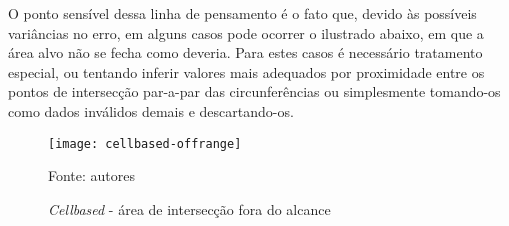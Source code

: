 O ponto sensível dessa linha de pensamento é o fato que, devido às possíveis variâncias no erro, em alguns casos pode ocorrer o ilustrado abaixo, em que a área alvo não se fecha como deveria. Para estes casos é necessário tratamento especial, ou tentando inferir valores mais adequados por proximidade entre os pontos de intersecção par-a-par das circunferências ou simplesmente tomando-os como dados inválidos demais e descartando-os.

\begin{figure}[ht]
  \centering
    \caption{\emph{Cellbased} - área de intersecção fora do alcance}
    \texttt{[image: cellbased-offrange]}
	\centerline{\small{Fonte: autores}}
\end{figure}
\FloatBarrier
